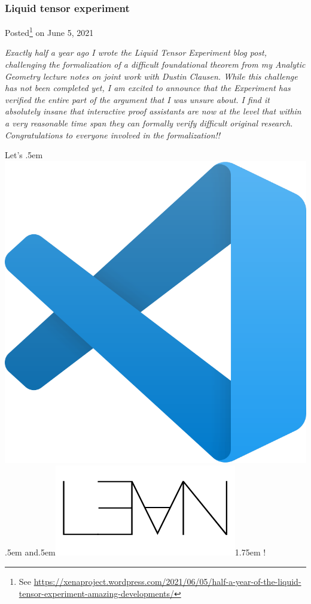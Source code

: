 \documentclass[10pt]{beamer}
\begin{document}
\begin{frame}
\frametitle{Liquid tensor experiment}
Posted\footnote{See \url{https://xenaproject.wordpress.com/2021/06/05/half-a-year-of-the-liquid-tensor-experiment-amazing-developments/}} on June 5, 2021
\vspace{.5cm}

\emph{Exactly half a year ago I wrote the Liquid Tensor Experiment blog post, challenging the formalization of a difficult foundational theorem from my Analytic Geometry lecture notes on joint work with Dustin Clausen. While this challenge has not been completed yet, I am excited to announce that \textcolor{arancio}{the Experiment has verified the entire part of the argument that I was unsure about}. I find it absolutely insane that \textcolor{arancio}{interactive proof assistants are now at the level that within a very reasonable time span they can formally verify difficult original research}. Congratulations to everyone involved in the formalization!!}
\pause

\vspace{.75cm}
Let's \kern.5em
\includegraphics[trim=0 9cm 0 0, scale=.025]{vscode_logo.png}\kern.5em and\kern.5em\includegraphics[trim=0 1.45cm 5cm 5cm, scale=.1]{lean_logo.png}\kern1.75em !
\end{frame}
\end{document}
